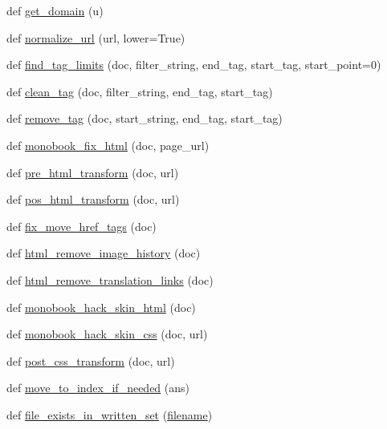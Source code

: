 \begin{DoxyCompactItemize}
\item 
def \hyperlink{namespacemw2html_a2d36f68588408049a6dee260b90e4a00}{get\+\_\+domain} (u)
\item 
def \hyperlink{namespacemw2html_a961d7236f041373024cd63627b0b5ff1}{normalize\+\_\+url} (url, lower=True)
\item 
def \hyperlink{namespacemw2html_af9b0857d6e1c908ff25375c30c83b7e9}{find\+\_\+tag\+\_\+limits} (doc, filter\+\_\+string, end\+\_\+tag, start\+\_\+tag, start\+\_\+point=0)
\item 
def \hyperlink{namespacemw2html_a11c9115ac32ff8e16d49134b7357e513}{clean\+\_\+tag} (doc, filter\+\_\+string, end\+\_\+tag, start\+\_\+tag)
\item 
def \hyperlink{namespacemw2html_ae86437c788ea1c078dcfc2e1c51bd6b7}{remove\+\_\+tag} (doc, start\+\_\+string, end\+\_\+tag, start\+\_\+tag)
\item 
def \hyperlink{namespacemw2html_aa3fb13486d9fcbbc797c6d9e529720e1}{monobook\+\_\+fix\+\_\+html} (doc, page\+\_\+url)
\item 
def \hyperlink{namespacemw2html_abb39f2d776dedabfd5ea74688dd1c4e0}{pre\+\_\+html\+\_\+transform} (doc, url)
\item 
def \hyperlink{namespacemw2html_a35b3bd3a1d2b7fd9ee2eba67e2439b34}{pos\+\_\+html\+\_\+transform} (doc, url)
\item 
def \hyperlink{namespacemw2html_a13bb26a656d1399bc7151257b069ab1a}{fix\+\_\+move\+\_\+href\+\_\+tags} (doc)
\item 
def \hyperlink{namespacemw2html_af7f9204ba52f0f0be1f8fd1b509a1ea5}{html\+\_\+remove\+\_\+image\+\_\+history} (doc)
\item 
def \hyperlink{namespacemw2html_a6fe34b8a32ad33ed42e43b701d7bee44}{html\+\_\+remove\+\_\+translation\+\_\+links} (doc)
\item 
def \hyperlink{namespacemw2html_abab77dedc32b0b58b90fa08f41d43013}{monobook\+\_\+hack\+\_\+skin\+\_\+html} (doc)
\item 
def \hyperlink{namespacemw2html_a700ccd260707cb87c849f16b965de8e1}{monobook\+\_\+hack\+\_\+skin\+\_\+css} (doc, url)
\item 
def \hyperlink{namespacemw2html_a357e206b4fe4d7dde01ee0f85fbf7f65}{post\+\_\+css\+\_\+transform} (doc, url)
\item 
def \hyperlink{namespacemw2html_a7f5904e66838ab9fb740ac24705a8dbd}{move\+\_\+to\+\_\+index\+\_\+if\+\_\+needed} (ans)
\item 
def \hyperlink{namespacemw2html_a67cbfd20f0c99193357508e9af8b8568}{file\+\_\+exists\+\_\+in\+\_\+written\+\_\+set} (\hyperlink{test__portburn_8cpp_a7efa5e9c7494c7d4586359300221aa5d}{filename})

\end{DoxyCompactItemize}
